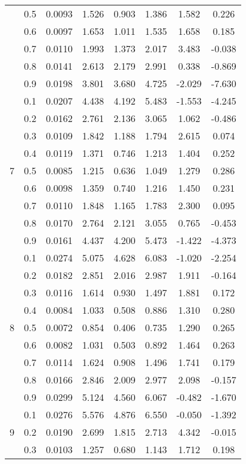 \documentclass[11pt,a4paper]{report}
\begin{document}
\begin{longtable}{ | c | c || c | c | c | c | c | c | }
 & 0.5 & 0.0093 & 1.526 & 0.903 & 1.386 & 1.582 & 0.226 \\
 & 0.6 & 0.0097 & 1.653 & 1.011 & 1.535 & 1.658 & 0.185 \\
 & 0.7 & 0.0110 & 1.993 & 1.373 & 2.017 & 3.483 & -0.038 \\
 & 0.8 & 0.0141 & 2.613 & 2.179 & 2.991 & 0.338 & -0.869 \\
 & 0.9 & 0.0198 & 3.801 & 3.680 & 4.725 & -2.029 & -7.630 \\
 \hline
\multirow{9}{*}{7} & 0.1 & 0.0207 & 4.438 & 4.192 & 5.483 & -1.553 & -4.245 \\
 & 0.2 & 0.0162 & 2.761 & 2.136 & 3.065 & 1.062 & -0.486 \\
 & 0.3 & 0.0109 & 1.842 & 1.188 & 1.794 & 2.615 & 0.074 \\
 & 0.4 & 0.0119 & 1.371 & 0.746 & 1.213 & 1.404 & 0.252 \\
 & 0.5 & 0.0085 & 1.215 & 0.636 & 1.049 & 1.279 & 0.286 \\
 & 0.6 & 0.0098 & 1.359 & 0.740 & 1.216 & 1.450 & 0.231 \\
 & 0.7 & 0.0110 & 1.848 & 1.165 & 1.783 & 2.300 & 0.095 \\
 & 0.8 & 0.0170 & 2.764 & 2.121 & 3.055 & 0.765 & -0.453 \\
 & 0.9 & 0.0161 & 4.437 & 4.200 & 5.473 & -1.422 & -4.373 \\
 \hline
\multirow{9}{*}{8} & 0.1 & 0.0274 & 5.075 & 4.628 & 6.083 & -1.020 & -2.254 \\
 & 0.2 & 0.0182 & 2.851 & 2.016 & 2.987 & 1.911 & -0.164 \\
 & 0.3 & 0.0116 & 1.614 & 0.930 & 1.497 & 1.881 & 0.172 \\
 & 0.4 & 0.0084 & 1.033 & 0.508 & 0.886 & 1.310 & 0.280 \\
 & 0.5 & 0.0072 & 0.854 & 0.406 & 0.735 & 1.290 & 0.265 \\
 & 0.6 & 0.0082 & 1.031 & 0.503 & 0.892 & 1.464 & 0.263 \\
 & 0.7 & 0.0114 & 1.624 & 0.908 & 1.496 & 1.741 & 0.179 \\
 & 0.8 & 0.0166 & 2.846 & 2.009 & 2.977 & 2.098 & -0.157 \\
 & 0.9 & 0.0299 & 5.124 & 4.560 & 6.067 & -0.482 & -1.670 \\
 \hline
\multirow{9}{*}{9} & 0.1 & 0.0276 & 5.576 & 4.876 & 6.550 & -0.050 & -1.392 \\
 & 0.2 & 0.0190 & 2.699 & 1.815 & 2.713 & 4.342 & -0.015 \\
 & 0.3 & 0.0103 & 1.257 & 0.680 & 1.143 & 1.712 & 0.198 \\

\end{longtable}
\end{document}
